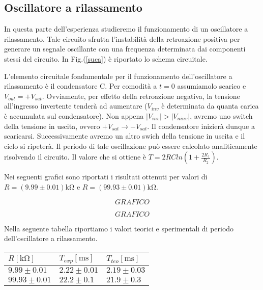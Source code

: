 \subsection{Oscillatore a rilassamento}
In questa parte dell'esperienza studieremo il funzionamento di un oscillatore a rilassamento. Tale circuito sfrutta l'instabilità della retroazione positiva per generare un segnale oscillante con una frequenza determinata dai componenti stessi del circuito. In Fig.(\ref{suca}) è riportato lo schema circuitale. 

L'elemento circuitale fondamentale per il funzionamento dell'oscillatore a rilassamento è il condensatore C. Per comodità a $t=0$ assumiamolo scarico e $V_{out}=+V_{sat}$. Ovviamente, per effetto della retroazione negativa, la tensione all'ingresso invertente tenderà ad aumentare ($V_{inv}$ è determinata da quanta carica è accumulata sul condensatore). Non appena $|V_{inv}|>|V_{ninv}|$, avremo uno switch della tensione in uscita, ovvero $+V_{sat} \rightarrow -V_{sat}$. Il condensatore inizierà dunque a scaricarsi. Successivamente avremo un altro swich della tensione in uscita e il ciclo si ripeterà. Il periodo di tale oscillazione può essere calcolato analiticamente risolvendo il circuito. Il valore che si ottiene è $T=2RCln(1+\frac{2R_1}{R_2})$.  

Nei seguenti grafici sono riportati i risultati ottenuti per valori di $R=(9.99\pm0.01)\si{\kilo\ohm}$ e $R=(99.93\pm0.01)\si{\kilo\ohm}$.


$$GRAFICO$$

$$GRAFICO$$

Nella seguente tabella riportiamo i valori teorici e sperimentali di periodo dell'oscillatore a rilassamento.

\begin{tabular}{|l|l|l|}
\hline
$R [\si{\kilo\ohm}]$	&  $T_{exp} [\si{\milli\second}]$          & $T_{teo} [\si{\milli\second}]$       \\
\hline
$9.99\pm0.01 $ & $2.22\pm0.01$ & $2.19 \pm 0.03$\\
\hline
$99.93\pm0.01 $ & $22.2\pm0.1$ & $21.9 \pm 0.3$\\
\hline
\end{tabular} 
